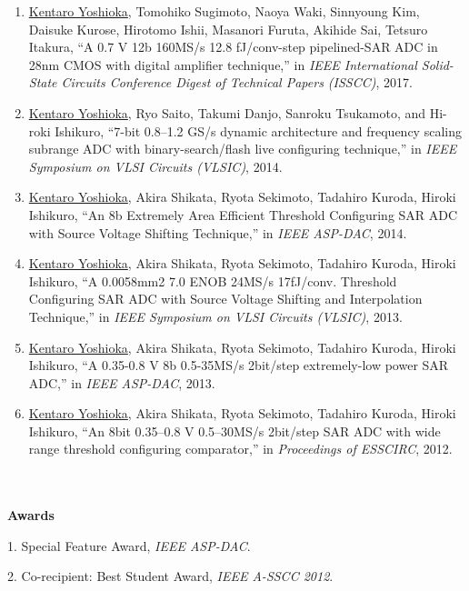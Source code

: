 \begin{enumerate}
\item	\underline{Kentaro Yoshioka}, Tomohiko Sugimoto, Naoya Waki, Sinnyoung Kim, Daisuke Kurose, Hirotomo Ishii, Masanori Furuta, Akihide Sai, Tetsuro Itakura, “A 0.7 V 12b 160MS/s 12.8 fJ/conv-step pipelined-SAR ADC in 28nm CMOS with digital amplifier technique,” in \textit{IEEE International  Solid-State  Circuits  Conference  Digest  of  Technical Papers (ISSCC)}, 2017.

\item \underline{Kentaro Yoshioka},  Ryo  Saito,  Takumi  Danjo,  Sanroku  Tsukamoto,  and  Hi-roki Ishikuro,  “7-bit 0.8–1.2 GS/s dynamic architecture and frequency scaling subrange  ADC  with  binary-search/flash  live  configuring  technique,” in \textit{IEEE Symposium on VLSI Circuits (VLSIC)}, 2014.

\item	\underline{Kentaro Yoshioka}, Akira Shikata, Ryota Sekimoto, Tadahiro Kuroda, Hiroki Ishikuro, “An 8b Extremely Area Efficient Threshold Configuring SAR ADC with Source Voltage Shifting Technique,” in \textit{IEEE ASP-DAC}, 2014.

\item	\underline{Kentaro Yoshioka}, Akira Shikata, Ryota Sekimoto, Tadahiro Kuroda, Hiroki Ishikuro, “A 0.0058mm2 7.0 ENOB 24MS/s 17fJ/conv. Threshold Configuring SAR ADC with Source Voltage Shifting and Interpolation Technique,” in \textit{IEEE Symposium on VLSI Circuits (VLSIC)}, 2013.

\item	\underline{Kentaro Yoshioka}, Akira Shikata, Ryota Sekimoto, Tadahiro Kuroda, Hiroki Ishikuro, “A 0.35-0.8 V 8b 0.5-35MS/s 2bit/step extremely-low power SAR ADC,” in \textit{IEEE ASP-DAC}, 2013.

\item \underline{Kentaro Yoshioka}, Akira Shikata, Ryota Sekimoto, Tadahiro Kuroda, Hiroki Ishikuro, “An 8bit 0.35–0.8 V 0.5–30MS/s 2bit/step SAR ADC with wide range threshold configuring comparator,” in \textit{Proceedings of ESSCIRC}, 2012.

\end{enumerate}
\\
\\
\large{\textbf{Awards}}
\normalsize

1. Special Feature Award, \textit{IEEE ASP-DAC}.

2. Co-recipient: Best Student Award, \textit{IEEE A-SSCC 2012}.
\vspace*{\fill} \newpage \rm

